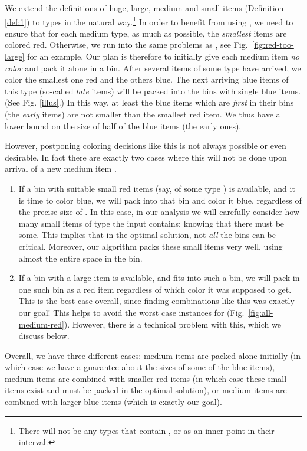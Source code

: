 We extend the definitions of huge, large, medium and small items (Definition \ref{def:1}) to types in the natural way.\footnote{There will not be any types that contain ,  or  as an inner point in their interval.}
In order to benefit from using \af, we need to ensure that for each medium type, as much as possible, the \emph{smallest} items are colored red.
Otherwise, we run into the same problems as {\SuperH}, see Fig.~\ref{fig:red-too-large} for an example.
Our plan is therefore to initially give each medium item \emph{no color} and pack it alone in a bin.
After several items of some type  have arrived, we color the smallest one red and the others blue.
The next arriving blue items of this type (so-called \emph{late} items) will be packed into the bins with single blue items.
(See Fig. \ref{illus}.) In this way, at least the blue items which are \emph{first} in their bins (the \emph{early} items) are
not smaller than the smallest red item. We thus have a lower bound on the size of half of the blue items (the early ones).

However, postponing coloring decisions like this is not always possible or even desirable. In fact there are exactly two cases where this will not be done upon
arrival of a new medium item .
\begin{enumerate}
	\item 
	If a bin with suitable small red items (say, of some type )
	is available, and it is time to color  blue,
	we will pack  into that bin and color it blue, regardless of the precise size of .
	In this case, in our analysis we will carefully consider how many small
	items of type  the input contains; knowing that there must be some.
	This implies that in the optimal solution, not \emph{all} the bins can be critical.
	Moreover, our algorithm packs these small items very well, using almost the entire space in the bin.
	\item
	If a bin with a large item is available, and  fits into such a bin, we will
	pack  in one such bin as a red item regardless of which color it was supposed to get. 
	This is the best case overall, since finding combinations like this was exactly our goal! 
	This helps to avoid the worst case instances for {\SuperH} (Fig.~\ref{fig:all-medium-red}).
	However, there is a technical problem with this, which we discuss below.
\end{enumerate}

Overall, we have three different cases: medium items are packed alone initially (in which case we have a guarantee about the sizes of some of the blue items), medium items are combined with smaller red items (in which case these small items exist and must be packed in the optimal solution), or medium items are combined with larger blue items (which is exactly our goal).

